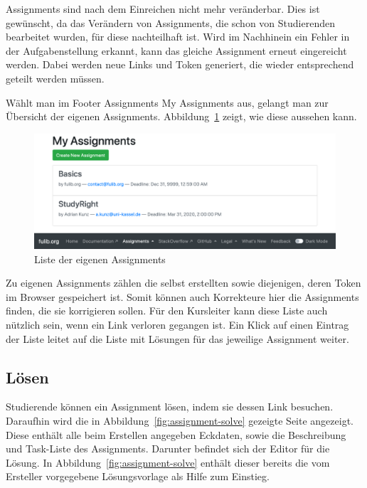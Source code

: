 Assignments sind nach dem Einreichen nicht mehr veränderbar.
Dies ist gewünscht, da das Verändern von Assignments, die schon von Studierenden bearbeitet wurden, für diese nachteilhaft ist.
Wird im Nachhinein ein Fehler in der Aufgabenstellung erkannt, kann das gleiche Assignment erneut eingereicht werden.
Dabei werden neue Links und Token generiert, die wieder entsprechend geteilt werden müssen.

Wählt man im Footer Assignments \textrightarrow My Assignments aus, gelangt man zur Übersicht der eigenen Assignments.
Abbildung~\ref{fig:my-assignments} zeigt, wie diese aussehen kann.

\begin{figure}
    \centering
    \includegraphics[width=\textwidth]{chapter/fulib.org/img/my-assignments.png}
    \caption{Liste der eigenen Assignments}
    \label{fig:my-assignments}
\end{figure}

Zu eigenen Assignments zählen die selbst erstellten sowie diejenigen, deren Token im Browser gespeichert ist.
Somit können auch Korrekteure hier die Assignments finden, die sie korrigieren sollen.
Für den Kursleiter kann diese Liste auch nützlich sein, wenn ein Link verloren gegangen ist.
Ein Klick auf einen Eintrag der Liste leitet auf die Liste mit Lösungen für das jeweilige Assignment weiter.

\subsection{Lösen}\label{subsec:solution}

Studierende können ein Assignment lösen, indem sie dessen Link besuchen.
Daraufhin wird die in Abbildung~\ref{fig:assignment-solve} gezeigte Seite angezeigt.
Diese enthält alle beim Erstellen angegeben Eckdaten, sowie die Beschreibung und Task-Liste des Assignments.
Darunter befindet sich der Editor für die Lösung.
In Abbildung~\ref{fig:assignment-solve} enthält dieser bereits die vom Ersteller vorgegebene Lösungsvorlage als Hilfe zum Einstieg.

